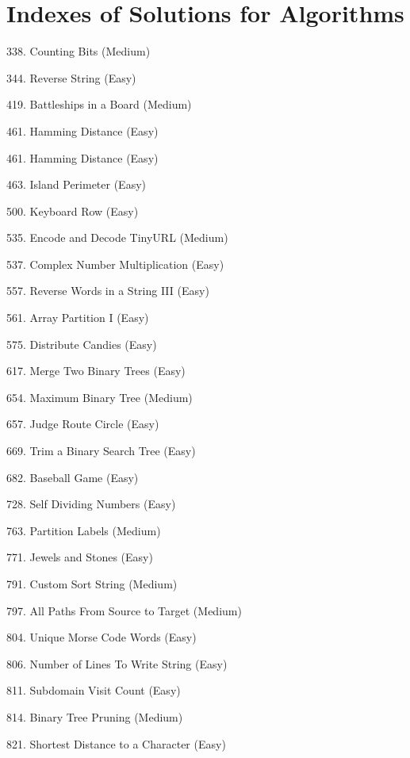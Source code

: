 \tocless\section{Indexes of Solutions for Algorithms}
\label{sec:algo_ind}

\begin{flushleft}
338. Counting Bits (Medium)\hfill\pageref{algo:338}

344. Reverse String (Easy)\hfill\pageref{algo:344}

419. Battleships in a Board (Medium)\hfill\pageref{algo:419}

461. Hamming Distance (Easy)\hfill\pageref{algo:461}

461. Hamming Distance (Easy)\hfill\pageref{algo:461}

463. Island Perimeter (Easy)\hfill\pageref{algo:463}

500. Keyboard Row (Easy)\hfill\pageref{algo:500}

535. Encode and Decode TinyURL (Medium)\hfill\pageref{algo:535}

537. Complex Number Multiplication (Easy)\hfill\pageref{algo:537}

557. Reverse Words in a String III (Easy)\hfill\pageref{algo:557}

561. Array Partition I (Easy)\hfill\pageref{algo:561}

575. Distribute Candies (Easy)\hfill\pageref{algo:575}

617. Merge Two Binary Trees (Easy)\hfill\pageref{algo:617}

654. Maximum Binary Tree (Medium)\hfill\pageref{algo:654}

657. Judge Route Circle (Easy)\hfill\pageref{algo:657}

669. Trim a Binary Search Tree (Easy)\hfill\pageref{algo:669}

682. Baseball Game (Easy)\hfill\pageref{algo:682}

728. Self Dividing Numbers (Easy)\hfill\pageref{algo:728}

763. Partition Labels (Medium)\hfill\pageref{algo:763}

771. Jewels and Stones (Easy)\hfill\pageref{algo:771}

791. Custom Sort String (Medium)\hfill\pageref{algo:791}

797. All Paths From Source to Target (Medium)\hfill\pageref{algo:797}

804. Unique Morse Code Words (Easy)\hfill\pageref{algo:804}

806. Number of Lines To Write String (Easy)\hfill\pageref{algo:806}

811. Subdomain Visit Count (Easy)\hfill\pageref{algo:811}

814. Binary Tree Pruning (Medium)\hfill\pageref{algo:814}

821. Shortest Distance to a Character (Easy)\hfill\pageref{algo:821}
\end{flushleft}

\newpage
